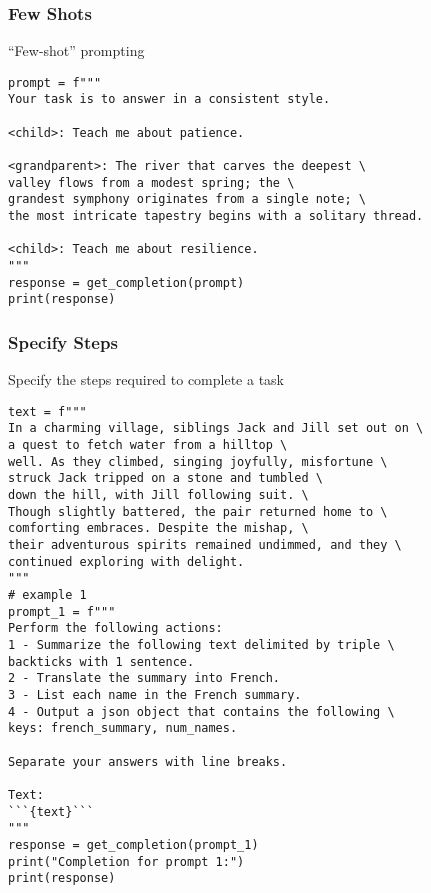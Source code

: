 \begin{frame}[fragile]\frametitle{Few Shots}

``Few-shot'' prompting

\begin{lstlisting}
prompt = f"""
Your task is to answer in a consistent style.

<child>: Teach me about patience.

<grandparent>: The river that carves the deepest \ 
valley flows from a modest spring; the \ 
grandest symphony originates from a single note; \ 
the most intricate tapestry begins with a solitary thread.

<child>: Teach me about resilience.
"""
response = get_completion(prompt)
print(response)
\end{lstlisting}
		
		
\end{frame}

\begin{frame}[fragile]\frametitle{Specify Steps}

Specify the steps required to complete a task

{\tiny
\begin{lstlisting}
text = f"""
In a charming village, siblings Jack and Jill set out on \ 
a quest to fetch water from a hilltop \ 
well. As they climbed, singing joyfully, misfortune \ 
struck Jack tripped on a stone and tumbled \ 
down the hill, with Jill following suit. \ 
Though slightly battered, the pair returned home to \ 
comforting embraces. Despite the mishap, \ 
their adventurous spirits remained undimmed, and they \ 
continued exploring with delight.
"""
# example 1
prompt_1 = f"""
Perform the following actions: 
1 - Summarize the following text delimited by triple \
backticks with 1 sentence.
2 - Translate the summary into French.
3 - List each name in the French summary.
4 - Output a json object that contains the following \
keys: french_summary, num_names.

Separate your answers with line breaks.

Text:
```{text}```
"""
response = get_completion(prompt_1)
print("Completion for prompt 1:")
print(response)
\end{lstlisting}
}		
		
\end{frame}

